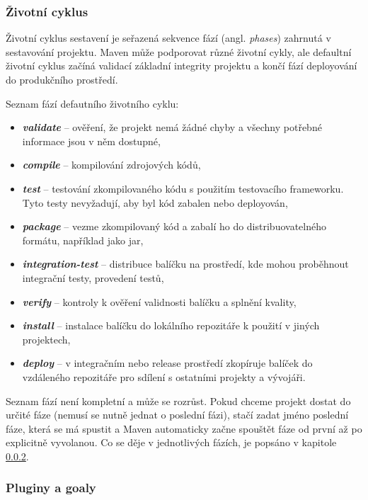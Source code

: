 \documentclass[11pt,twoside,a4paper]{book}
\begin{document}
\subsubsection{Životní cyklus}

Životní cyklus sestavení je seřazená sekvence fází (angl. {\em phases}) zahrnutá
v sestavování projektu. Maven může podporovat různé životní cykly, ale defaultní
životní cyklus začíná validací základní integrity projektu a končí fází deployování do produkčního prostředí.

Seznam fází defautního životního cyklu:

\begin{itemize}
  \item \textbf{\textit{validate}} – ověření, že projekt nemá žádné
  chyby a všechny potřebné informace jsou v něm dostupné,
  \item \textbf{\textit{compile}} – kompilování zdrojových kódů,
  \item \textbf{\textit{test}} – testování zkompilovaného kódu s použitím
  testovacího frameworku. Tyto testy nevyžadují, aby byl kód zabalen nebo deployován,
  \item \textbf{\textit{package}} – vezme zkompilovaný kód a zabalí ho do
  distribuovatelného formátu, například jako jar,
\item \textbf{\textit{integration-test}} – distribuce balíčku na
prostředí, kde mohou proběhnout integrační testy, provedení testů,
\item \textbf{\textit{verify}} – kontroly k ověření validnosti balíčku a
splnění kvality,
\item \textbf{\textit{install}} – instalace balíčku do lokálního repozitáře
k použití v jiných projektech,
\item \textbf{\textit{deploy}} – v integračním nebo release prostředí
zkopíruje balíček do vzdáleného repozitáře pro sdílení s ostatními projekty a
vývojáři.
\end{itemize}

Seznam fází není kompletní a může se rozrůst. Pokud chceme projekt dostat do určité fáze
(nemusí se nutně jednat o poslední fázi), stačí zadat jméno poslední fáze, která se má spustit a
Maven automaticky začne spouštět fáze od první až po explicitně vyvolanou. Co se děje v
jednotlivých fázích, je popsáno v kapitole \ref{subsec:pluginy-a-goaly}.

\subsubsection{Pluginy a goaly}
\label{subsec:pluginy-a-goaly}
\end{document}
